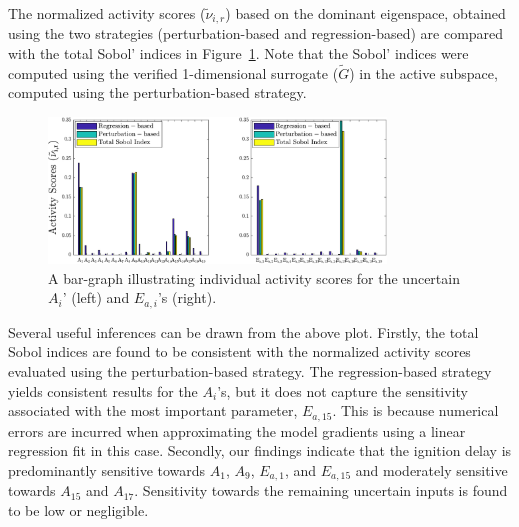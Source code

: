 The normalized activity scores ($\tilde{\nu}_{i,r}$) based on the dominant eigenspace, obtained
using the two strategies (perturbation-based and regression-based) are compared with the 
total Sobol' indices
in Figure~\ref{fig:as_33D}. Note that the Sobol' indices were computed using the verified
1-dimensional surrogate ($\tilde{G}$) in the active subspace, computed using the 
perturbation-based strategy. 
%
\begin{figure}[htbp]
 \begin{center}
  \includegraphics[width=0.8\textwidth]{./Figures/as_33D_new}
\caption{A bar-graph illustrating individual activity scores for the uncertain $A_i$' (left) and $E_{a,i}$'s (right).}
\label{fig:as_33D}
\end{center}
\end{figure}
%
Several useful inferences can be drawn from the above plot. Firstly, the total Sobol indices are found to be
consistent
with the normalized activity scores evaluated using the perturbation-based strategy. The regression-based
strategy yields consistent results for the $A_i$'s, but it does not capture the sensitivity associated with
the most important parameter, $E_{a,15}$. This is because numerical errors are incurred when approximating
the model gradients using a linear regression fit in this case. 
Secondly, our findings indicate that   
the ignition delay is predominantly sensitive towards $A_1$, $A_9$, $E_{a,1}$, and $E_{a,15}$ and 
moderately sensitive towards $A_{15}$ and $A_{17}$. Sensitivity towards the remaining uncertain inputs is
found to be low or negligible. 

